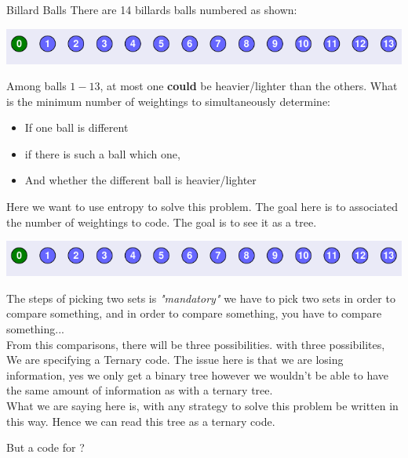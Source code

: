 \begin{parag}{Billard Balls}
    There are 14 billards balls numbered as shown:
\begin{center}
    \includegraphics[scale=0.6]{32025-03-11.png}
\end{center}
Among balls $1-13$, at most one \textbf{could} be heavier/lighter than the others. What is the minimum number of weightings to simultaneously determine:
\begin{itemize}
    \item If one ball is different
    \item if there is such a ball which one, 
        \item And whether the different ball is heavier/lighter
\end{itemize}
Here we want to use entropy to solve this problem. The goal here is to associated the number of weightings to code. The goal is to see it as a tree.
\begin{center}
    \includegraphics[scale=0.5]{32025-03-11.png}
\end{center}
The steps of picking two sets is \textit{"mandatory"} we have to pick two sets in order to compare something, and in order to compare something, you have to compare something...\\
From this comparisons, there will be three possibilities. with three possibilites, We are specifying a Ternary code. 
    The issue here is that we are losing information, yes we only get a binary tree however we wouldn't be able to have the same amount of information as with  a ternary tree. \\
    What we are saying here is, with any strategy to solve this problem  be written in this way. Hence we can read this tree as a ternary code.
\begin{subparag}{But a code for ?}

\end{subparag}
\end{parag}
